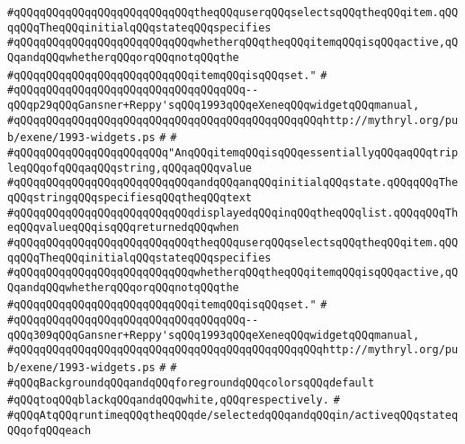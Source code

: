 \verb|#qQQqqQQqqQQqqQQqqQQqqQQqqQQqtheqQQquserqQQqselectsqQQqtheqQQqitem.qQQqqQQqTheqQQqinitialqQQqstateqQQqspecifies|\newline
\verb|#qQQqqQQqqQQqqQQqqQQqqQQqqQQqwhetherqQQqtheqQQqitemqQQqisqQQqactive,qQQqandqQQqwhetherqQQqorqQQqnotqQQqthe|\newline
\verb|#qQQqqQQqqQQqqQQqqQQqqQQqqQQqitemqQQqisqQQqset."|\newline
\verb|#|\newline
\verb|#qQQqqQQqqQQqqQQqqQQqqQQqqQQqqQQqqQQq--qQQqp29qQQqGansner+Reppy'sqQQq1993qQQqeXeneqQQqwidgetqQQqmanual,|\newline
\verb|#qQQqqQQqqQQqqQQqqQQqqQQqqQQqqQQqqQQqqQQqqQQqqQQqhttp://mythryl.org/pub/exene/1993-widgets.ps|\newline
\verb|#|\newline
\verb|#|\newline
\verb|#qQQqqQQqqQQqqQQqqQQqqQQq"AnqQQqitemqQQqisqQQqessentiallyqQQqaqQQqtripleqQQqofqQQqaqQQqstring,qQQqaqQQqvalue|\newline
\verb|#qQQqqQQqqQQqqQQqqQQqqQQqqQQqandqQQqanqQQqinitialqQQqstate.qQQqqQQqTheqQQqstringqQQqspecifiesqQQqtheqQQqtext|\newline
\verb|#qQQqqQQqqQQqqQQqqQQqqQQqqQQqdisplayedqQQqinqQQqtheqQQqlist.qQQqqQQqTheqQQqvalueqQQqisqQQqreturnedqQQqwhen|\newline
\verb|#qQQqqQQqqQQqqQQqqQQqqQQqqQQqtheqQQquserqQQqselectsqQQqtheqQQqitem.qQQqqQQqTheqQQqinitialqQQqstateqQQqspecifies|\newline
\verb|#qQQqqQQqqQQqqQQqqQQqqQQqqQQqwhetherqQQqtheqQQqitemqQQqisqQQqactive,qQQqandqQQqwhetherqQQqorqQQqnotqQQqthe|\newline
\verb|#qQQqqQQqqQQqqQQqqQQqqQQqqQQqitemqQQqisqQQqset."|\newline
\verb|#|\newline
\verb|#qQQqqQQqqQQqqQQqqQQqqQQqqQQqqQQqqQQq--qQQq309qQQqGansner+Reppy'sqQQq1993qQQqeXeneqQQqwidgetqQQqmanual,|\newline
\verb|#qQQqqQQqqQQqqQQqqQQqqQQqqQQqqQQqqQQqqQQqqQQqqQQqhttp://mythryl.org/pub/exene/1993-widgets.ps|\newline
\verb|#|\newline
\verb|#|\newline
\verb|#qQQqBackgroundqQQqandqQQqforegroundqQQqcolorsqQQqdefault|\newline
\verb|#qQQqtoqQQqblackqQQqandqQQqwhite,qQQqrespectively.|\newline
\verb|#|\newline
\verb|#qQQqAtqQQqruntimeqQQqtheqQQqde/selectedqQQqandqQQqin/activeqQQqstateqQQqofqQQqeach|\newline
